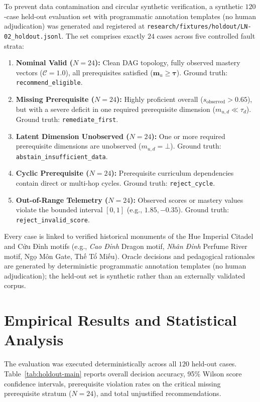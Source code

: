 \documentclass[11pt,a4paper]{article}
\begin{document}
To prevent data contamination and circular synthetic verification, a synthetic $120$-case held-out evaluation set with programmatic annotation templates (no human adjudication) was generated and registered at \texttt{research/fixtures/holdout/LN-02\_holdout.jsonl}. The set comprises exactly $24$ cases across five controlled fault strata:
\begin{enumerate}[leftmargin=2.0em]
    \item \textbf{Nominal Valid ($N=24$):} Clean DAG topology, fully observed mastery vectors ($\mathcal{C}=1.0$), all prerequisites satisfied ($\mathbf{m}_u \ge \boldsymbol{\tau}$). Ground truth: \texttt{recommend\_eligible}.
    \item \textbf{Missing Prerequisite ($N=24$):} Highly proficient overall ($s_{\text{observed}} > 0.65$), but with a severe deficit in one required prerequisite dimension ($m_{u, d} \ll \tau_d$). Ground truth: \texttt{remediate\_first}.
    \item \textbf{Latent Dimension Unobserved ($N=24$):} One or more required prerequisite dimensions are unobserved ($m_{u, d} = \bot$). Ground truth: \texttt{abstain\_insufficient\_data}.
    \item \textbf{Cyclic Prerequisite ($N=24$):} Prerequisite curriculum dependencies contain direct or multi-hop cycles. Ground truth: \texttt{reject\_cycle}.
    \item \textbf{Out-of-Range Telemetry ($N=24$):} Observed scores or mastery values violate the bounded interval $[0, 1]$ (e.g., $1.85, -0.35$). Ground truth: \texttt{reject\_invalid\_score}.
\end{enumerate}

Every case is linked to verified historical monuments of the Hue Imperial Citadel and Cửu Đỉnh motifs (e.g., \textit{Cao Đỉnh} Dragon motif, \textit{Nhân Đỉnh} Perfume River motif, Ngọ Môn Gate, Thế Tổ Miếu). Oracle decisions and pedagogical rationales are generated by deterministic programmatic annotation templates (no human adjudication); the held-out set is synthetic rather than an externally validated corpus.

\section{Empirical Results and Statistical Analysis}

The evaluation was executed deterministically across all $120$ held-out cases. Table~\ref{tab:holdout-main} reports overall decision accuracy, 95\% Wilson score confidence intervals, prerequisite violation rates on the critical missing prerequisite stratum ($N=24$), and total unjustified recommendations.
\end{document}
